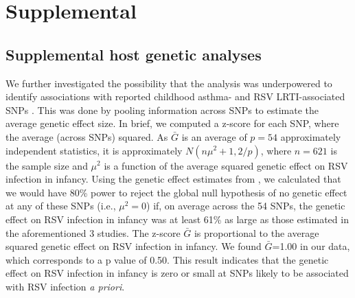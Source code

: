 \documentclass{article} %
\newcommand{\beginsupplement}{%
        \setcounter{table}{0}
        \renewcommand{\thetable}{S\arabic{table}}%
        \setcounter{figure}{0}
        \renewcommand{\thefigure}{S\arabic{figure}}%
     }
\begin{document}




\beginsupplement
\section{Supplemental}
 \label{sec:Supplemental_text}

\subsection{Supplemental host genetic analyses}
We further investigated the possibility that the analysis was underpowered to identify associations with reported childhood asthma- and RSV LRTI-associated SNPs \citep{pividori2019shared, janssen2007genetic, pasanen2017genome}.
This was done by pooling information across SNPs to estimate the average genetic effect size. In brief, we computed a z-score for each SNP, where the average (across SNPs) squared. 
As $\bar{G}$  is an average of $p=54$ approximately independent statistics, it is approximately
$N(n\mu^2 + 1,2/p)$, where $n=621$  is the sample size and $\mu^2$ is a function of the average squared
genetic effect on RSV infection in infancy. Using the genetic effect estimates from 
\citet{pividori2019shared, janssen2007genetic, pasanen2017genome}
, we calculated that we would have 80\% power
to reject the global null hypothesis of no genetic effect at any of
these SNPs (i.e., $\mu^2 =0$) if, on average across the 54 SNPs, the genetic effect on RSV infection
in infancy was at least 61\% as large as those estimated in the aforementioned 3 studies. The 
z-score $\bar{G}$ is proportional to the average squared genetic effect on RSV infection in infancy. We
found $\bar{G}$=1.00  in our data, which corresponds to a p value of 0.50. This result indicates that the genetic effect on RSV infection in infancy is zero or small at SNPs likely to be associated with RSV infection \textit{a priori}.
\end{document}
